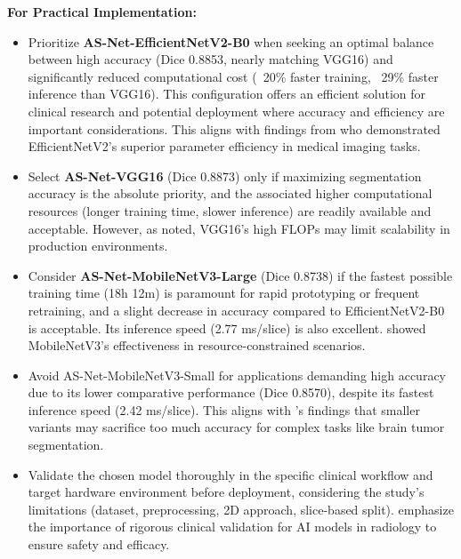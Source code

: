 \textbf{For Practical Implementation:}
\begin{itemize}
  \item Prioritize \textbf{AS-Net-EfficientNetV2-B0} when seeking an optimal balance between high accuracy (Dice 0.8853, nearly matching VGG16) and significantly reduced computational cost (~20\% faster training, ~29\% faster inference than VGG16). This configuration offers an efficient solution for clinical research and potential deployment where accuracy and efficiency are important considerations. This aligns with findings from \textcite{tan2021efficientnetv2} who demonstrated EfficientNetV2's superior parameter efficiency in medical imaging tasks.

  \item Select \textbf{AS-Net-VGG16} (Dice 0.8873) only if maximizing segmentation accuracy is the absolute priority, and the associated higher computational resources (longer training time, slower inference) are readily available and acceptable. However, as \textcite{canziani2016analysis} noted, VGG16's high FLOPs may limit scalability in production environments.

  \item Consider \textbf{AS-Net-MobileNetV3-Large} (Dice 0.8738) if the fastest possible training time (18h 12m) is paramount for rapid prototyping or frequent retraining, and a slight decrease in accuracy compared to EfficientNetV2-B0 is acceptable. Its inference speed (2.77 ms/slice) is also excellent. \textcite{howard2019searching} showed MobileNetV3's effectiveness in resource-constrained scenarios.

  \item Avoid AS-Net-MobileNetV3-Small for applications demanding high accuracy due to its lower comparative performance (Dice 0.8570), despite its fastest inference speed (2.42 ms/slice). This aligns with \textcite{pavithra2023mobilenetv2}'s findings that smaller variants may sacrifice too much accuracy for complex tasks like brain tumor segmentation.

  \item Validate the chosen model thoroughly in the specific clinical workflow and target hardware environment before deployment, considering the study's limitations (dataset, preprocessing, 2D approach, slice-based split). \textcite{yao2020deeplearning} emphasize the importance of rigorous clinical validation for AI models in radiology to ensure safety and efficacy.
\end{itemize}

